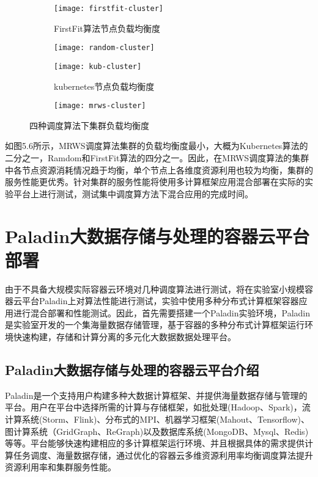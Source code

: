 \begin{figure}[H]
	\centering%
	\begin{subfigure}{7cm}
		\texttt{[image: firstfit-cluster]}
		\caption{FirstFit算法节点负载均衡度}
	\end{subfigure}%
	\hspace{0.5cm}%
	\begin{subfigure}{7cm}
		\texttt{[image: random-cluster]}
	\end{subfigure}
	\begin{subfigure}{7cm}
		\texttt{[image: kub-cluster]}
		\caption{kubernetes节点负载均衡度}
	\end{subfigure}%
	\hspace{0.5cm}%
	\begin{subfigure}{7cm}
		\texttt{[image: mrws-cluster]}
	\end{subfigure}
	\caption{四种调度算法下集群负载均衡度}	
\end{figure}

如图5.6所示，MRWS调度算法集群的负载均衡度最小，大概为Kubernetes算法的二分之一，Ramdom和FirstFit算法的四分之一。因此，在MRWS调度算法的集群中各节点资源消耗情况趋于均衡，单个节点上各维度资源利用也较为均衡，集群的服务性能更优秀。针对集群的服务性能将使用多计算框架应用混合部署在实际的实验平台上进行测试，测试集中调度算方法下混合应用的完成时间。

\section{Paladin大数据存储与处理的容器云平台部署}
由于不具备大规模实际容器云环境对几种调度算法进行测试，将在实验室小规模容器云平台Paladin上对算法性能进行测试，实验中使用多种分布式计算框架容器应用进行混合部署和性能测试。因此，首先需要搭建一个Paladin实验环境，Paladin是实验室开发的一个集海量数据存储管理，基于容器的多种分布式计算框架运行环境快速构建，存储和计算分离的多元化大数据数据处理平台。
\subsection{Paladin大数据存储与处理的容器云平台介绍}
Paladin是一个支持用户构建多种大数据计算框架、并提供海量数据存储与管理的平台。用户在平台中选择所需的计算与存储框架，如批处理(Hadoop、Spark)，流计算系统(Storm、Flink)、分布式的MPI、机器学习框架(Mahout、Tensorflow)、图计算系统（GridGraph、ReGraph)以及数据库系统(MongoDB、Mysql、Redis)等等。平台能够快速构建相应的多计算框架运行环境、并且根据具体的需求提供计算任务调度、海量数据存储，通过优化的容器云多维资源利用率均衡调度算法提升资源利用率和集群服务性能。

